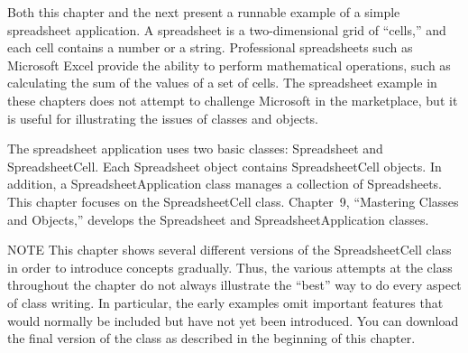 Both this chapter and the next present a runnable example of a simple spreadsheet application. A spreadsheet is a two-dimensional grid of “cells,” and each cell contains a number or a string. Professional spreadsheets such as Microsoft Excel provide the ability to perform mathematical operations, such as calculating the sum of the values of a set of cells. The spreadsheet example in these chapters does not attempt to challenge Microsoft in the marketplace, but it is useful for illustrating the issues of classes and objects.

The spreadsheet application uses two basic classes: Spreadsheet and SpreadsheetCell. Each Spreadsheet object contains SpreadsheetCell objects. In addition, a SpreadsheetApplication class manages a collection of Spreadsheets. This chapter focuses on the SpreadsheetCell class. Chapter 9, “Mastering Classes and Objects,” develops the Spreadsheet and SpreadsheetApplication classes.

\begin{myNotic}{NOTE}
This chapter shows several different versions of the SpreadsheetCell class in order to introduce concepts gradually. Thus, the various attempts at the class throughout the chapter do not always illustrate the “best” way to do every aspect of class writing. In particular, the early examples omit important features that would normally be included but have not yet been introduced. You can download the final version of the class as described in the beginning of this chapter.
\end{myNotic}











